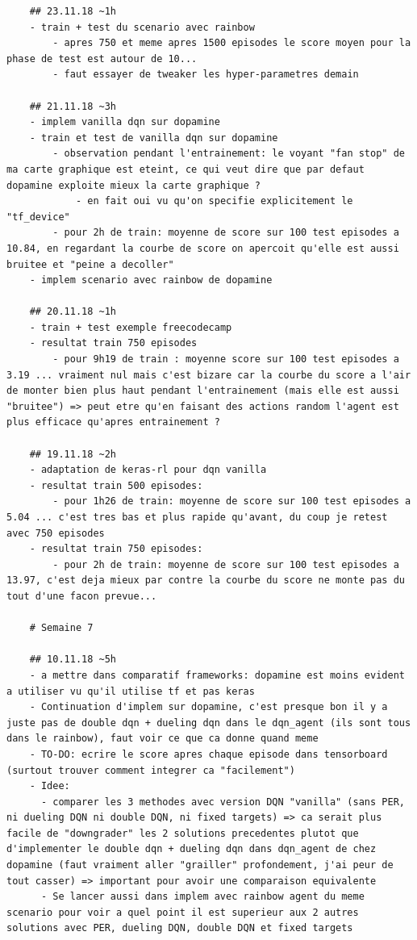 \documentclass[a4paper,10pt,openany,oneside]{report}
\begin{document}
\begin{lstlisting}
	## 23.11.18 ~1h
	- train + test du scenario avec rainbow
		- apres 750 et meme apres 1500 episodes le score moyen pour la phase de test est autour de 10...
		- faut essayer de tweaker les hyper-parametres demain
	
	## 21.11.18 ~3h
	- implem vanilla dqn sur dopamine
	- train et test de vanilla dqn sur dopamine
		- observation pendant l'entrainement: le voyant "fan stop" de ma carte graphique est eteint, ce qui veut dire que par defaut dopamine exploite mieux la carte graphique ?
			- en fait oui vu qu'on specifie explicitement le "tf_device"
		- pour 2h de train: moyenne de score sur 100 test episodes a 10.84, en regardant la courbe de score on apercoit qu'elle est aussi bruitee et "peine a decoller"
	- implem scenario avec rainbow de dopamine
	
	## 20.11.18 ~1h
	- train + test exemple freecodecamp
	- resultat train 750 episodes
		- pour 9h19 de train : moyenne score sur 100 test episodes a 3.19 ... vraiment nul mais c'est bizare car la courbe du score a l'air de monter bien plus haut pendant l'entrainement (mais elle est aussi "bruitee") => peut etre qu'en faisant des actions random l'agent est plus efficace qu'apres entrainement ?
	
	## 19.11.18 ~2h
	- adaptation de keras-rl pour dqn vanilla
	- resultat train 500 episodes:
		- pour 1h26 de train: moyenne de score sur 100 test episodes a 5.04 ... c'est tres bas et plus rapide qu'avant, du coup je retest avec 750 episodes
	- resultat train 750 episodes:
		- pour 2h de train: moyenne de score sur 100 test episodes a 13.97, c'est deja mieux par contre la courbe du score ne monte pas du tout d'une facon prevue...
	
	# Semaine 7
	
	## 10.11.18 ~5h
	- a mettre dans comparatif frameworks: dopamine est moins evident a utiliser vu qu'il utilise tf et pas keras
	- Continuation d'implem sur dopamine, c'est presque bon il y a juste pas de double dqn + dueling dqn dans le dqn_agent (ils sont tous dans le rainbow), faut voir ce que ca donne quand meme
	- TO-DO: ecrire le score apres chaque episode dans tensorboard (surtout trouver comment integrer ca "facilement")
	- Idee:
	  - comparer les 3 methodes avec version DQN "vanilla" (sans PER, ni dueling DQN ni double DQN, ni fixed targets) => ca serait plus facile de "downgrader" les 2 solutions precedentes plutot que d'implementer le double dqn + dueling dqn dans dqn_agent de chez dopamine (faut vraiment aller "grailler" profondement, j'ai peur de tout casser) => important pour avoir une comparaison equivalente
	  - Se lancer aussi dans implem avec rainbow agent du meme scenario pour voir a quel point il est superieur aux 2 autres solutions avec PER, dueling DQN, double DQN et fixed targets
	

\end{lstlisting}
\end{document}
